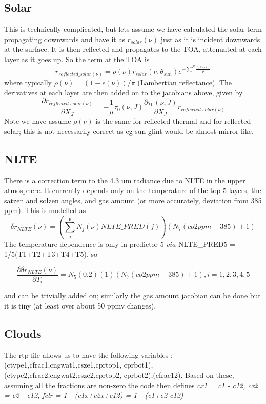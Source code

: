 \documentclass[11pt]{article}
\begin{document}
\subsection{Solar}
This is technically complicated, but lets assume we have calculated
the solar term propagating downwards and have it as $r_{solar}(\nu)$
just as it is incident downwards at the surface. It is then reflected
and propagates to the TOA, attenuated at each layer as it goes up. So
the term at the TOA is 
\[
r_{reflected\_solar(\nu)} = \rho(\nu) r_{solar}(\nu,\theta_{sun}) e^{-\sum_1^N \frac{\tau_0(\nu,i)}{\mu}}
\]
where typically $\rho(\nu) = (1-\epsilon(\nu))/\pi$ (Lambertian
reflectance). The derivatives at each layer are then added on to the jacobians above, given by
\[
\frac{\partial r_{reflected\_solar(\nu)}}{\partial X_J} = -\frac{1}{\mu} \tau_0(\nu,J) \frac{\partial \tau_0(\nu,J)}{\partial X_J}r_{reflected\_solar(\nu)}
\]
Note we have assume $\rho(\nu)$ is the same for reflected thermal and
for reflected solar; this is not necessarily correct as eg sun glint
would be almost mirror like.

\subsection{NLTE}
There is a correction term to the 4.3 um radiance due to NLTE
in the upper atmosphere. It currently depends only on the temperature
of the top 5 layers, the satzen and solzen angles, and \cd gas amount
(or more accurately, deviation from 385 ppm). This is modelled as
\[
\delta r_{NLTE}(\nu) = (\sum_j^6 N_j(\nu) NLTE\_PRED(j)) (N_7 (co2ppm-385)+1)
\]
The temperature dependence is only in predictor 5 $via$ NLTE\_PRED5 = 1/5(T1+T2+T3+T4+T5), so 

\[
\frac{\partial \delta r_{NLTE}(\nu)}{\partial T_i} = N_5 (0.2) (1) (N_7 (co2ppm-385)+1), i=1,2,3,4,5
\]

and can be trivially added on; similarly the \cd gas amount jacobian can be done but it is tiny (at least over about 50 ppmv changes).

\subsection{Clouds}
The rtp file allows us to have the following variables :
(ctype1,cfrac1,cngwat1,csze1,cprtop1,
cprbot1),(ctype2,cfrac2,cngwat2,csze2,cprtop2,
cprbot2),(cfrac12). Based on these, assuming all the fractions are
non-zero the code then defines \textit{cx1 = c1 - c12, cx2 = c2 - c12, fclr = 1 - (c1x+c2x+c12) = 1 - (c1+c2-c12)}
\end{document}
